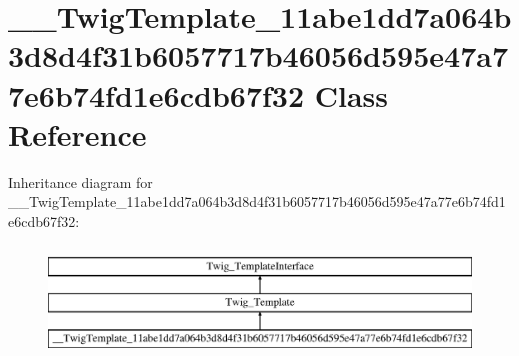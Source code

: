\hypertarget{class_____twig_template__11abe1dd7a064b3d8d4f31b6057717b46056d595e47a77e6b74fd1e6cdb67f32}{}\section{\+\_\+\+\_\+\+Twig\+Template\+\_\+11abe1dd7a064b3d8d4f31b6057717b46056d595e47a77e6b74fd1e6cdb67f32 Class Reference}
\label{class_____twig_template__11abe1dd7a064b3d8d4f31b6057717b46056d595e47a77e6b74fd1e6cdb67f32}
Inheritance diagram for \+\_\+\+\_\+\+Twig\+Template\+\_\+11abe1dd7a064b3d8d4f31b6057717b46056d595e47a77e6b74fd1e6cdb67f32\+:\begin{figure}[H]
\begin{center}
\leavevmode
\includegraphics[height=3.000000cm]{class_____twig_template__11abe1dd7a064b3d8d4f31b6057717b46056d595e47a77e6b74fd1e6cdb67f32}
\end{center}
\end{figure}
